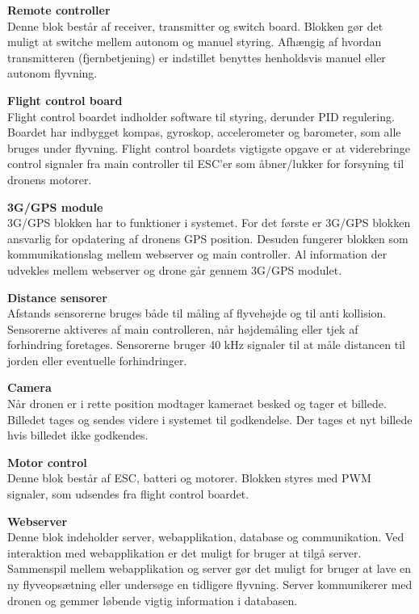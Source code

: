 \textbf{Remote controller}\\
Denne blok består af receiver, transmitter og switch board. Blokken gør det muligt at switche mellem autonom og manuel styring. Afhængig af hvordan transmitteren (fjernbetjening) er indstillet benyttes henholdsvis manuel eller autonom flyvning.

\textbf{Flight control board}\\
Flight control boardet indholder software til styring, derunder PID regulering. Boardet har indbygget kompas, gyroskop, accelerometer og barometer, som alle bruges under flyvning. Flight control boardets vigtigste opgave er at viderebringe control signaler fra main controller til ESC'er som åbner/lukker for forsyning til dronens motorer. 

\textbf{3G/GPS module}\\
3G/GPS blokken har to funktioner i systemet. For det første er 3G/GPS blokken ansvarlig for opdatering af dronens GPS position. Desuden fungerer blokken som kommunikationslag mellem webserver og main controller. Al information der udvekles mellem webserver og drone går gennem 3G/GPS modulet.

\textbf{Distance sensorer}\\
Afstands sensorerne bruges både til måling af flyvehøjde og til anti kollision. Sensorerne aktiveres af main controlleren, når højdemåling eller tjek af forhindring foretages. Sensorerne bruger 40 kHz signaler til at måle distancen til jorden eller eventuelle forhindringer.

\textbf{Camera}\\
Når dronen er i rette position modtager kameraet besked og tager et billede. Billedet tages og sendes videre i systemet til godkendelse. Der tages et nyt billede hvis billedet ikke godkendes.

\textbf{Motor control}\\
Denne blok består af ESC, batteri og motorer. Blokken styres med PWM signaler, som udsendes fra flight control boardet.

\textbf{Webserver}\\
Denne blok indeholder server, webapplikation, database og communikation. 
Ved interaktion med webapplikation er det muligt for bruger at tilgå server. Sammenspil mellem webapplikation og server gør det muligt for bruger at lave en ny flyveopsætning eller undersøge en tidligere flyvning. Server kommunikerer med dronen og gemmer løbende vigtig information i databasen.

